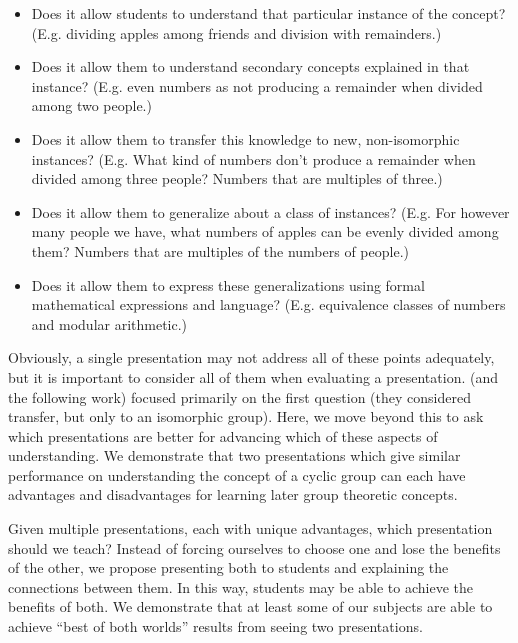 \documentclass[man,10pt]{apa6}
\begin{document}
\begin{itemize}
\item Does it allow students to understand that particular instance of the concept? (E.g. dividing apples among friends and division with remainders.) 
\item Does it allow them to understand secondary concepts explained in that instance? (E.g. even numbers as not producing a remainder when divided among two people.)
\item Does it allow them to transfer this knowledge to new, non-isomorphic instances? (E.g. What kind of numbers don't produce a remainder when divided among three people? Numbers that are multiples of three.)
\item Does it allow them to generalize about a class of instances? (E.g. For however many people we have, what numbers of apples can be evenly divided among them? Numbers that are multiples of the numbers of people.) 
\item Does it allow them to express these generalizations using formal mathematical expressions and language? (E.g. equivalence classes of numbers and modular arithmetic.)
\end{itemize}
Obviously, a single presentation may not address all of these points adequately, but it is important to consider all of them when evaluating a presentation.  (and the following work) focused primarily on the first question (they considered transfer, but only to an isomorphic group). Here, we move beyond this to ask which presentations are better for advancing which of these aspects of understanding. We demonstrate that two presentations which give similar performance on understanding the concept of a cyclic group can each have advantages and disadvantages for learning later group theoretic concepts.\par
Given multiple presentations, each with unique advantages, which presentation should we teach? Instead of forcing ourselves to choose one and lose the benefits of the other, we propose presenting both to students and explaining the connections between them. In this way, students may be able to achieve the benefits of both. We demonstrate that at least some of our subjects are able to achieve ``best of both worlds'' results from seeing two presentations. \par
\end{document}
